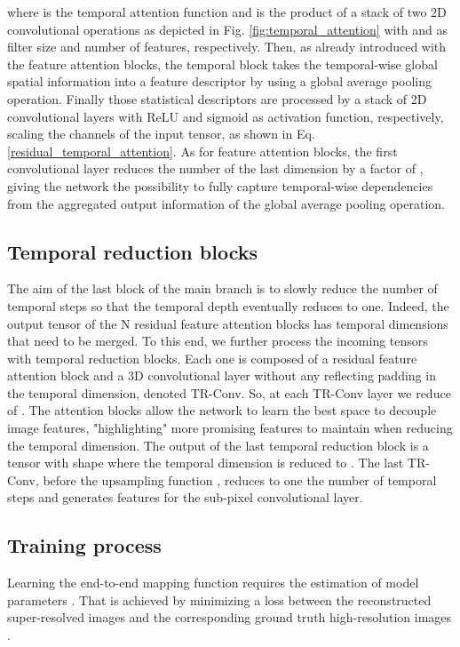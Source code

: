 \documentclass[journal]{IEEEtran}
\begin{document}
where  is the temporal attention function and  is the product of a stack of two 2D convolutional operations as depicted in Fig. \ref{fig:temporal_attention} with  and  as filter size and number of features, respectively. Then, as already introduced with the feature attention blocks, the temporal block takes the temporal-wise global spatial information into a feature descriptor by using a global average pooling operation. Finally those statistical descriptors are processed by a stack of 2D convolutional layers with ReLU and sigmoid as activation function, respectively, scaling the  channels of the input tensor, as shown in Eq. \ref{residual_temporal_attention}. As for feature attention blocks, the first convolutional layer reduces the number of the last dimension by a factor of , giving the network the possibility to fully capture temporal-wise dependencies from the aggregated output information of the global average pooling operation.
\subsection{Temporal reduction blocks}
The aim of the last block of the main branch is to slowly reduce the number of temporal steps so that the temporal depth eventually reduces to one. Indeed, the output tensor  of the N residual feature attention blocks has  temporal dimensions that need to be merged. To this end, we further process the incoming tensors with  temporal reduction blocks. Each one is composed of a residual feature attention block and a 3D convolutional layer without any reflecting padding in the temporal dimension, denoted TR-Conv. So, at each TR-Conv layer we reduce  of . The attention blocks allow the network to learn the best space to decouple image features, "highlighting" more promising features to maintain when reducing the temporal dimension. The output of the last temporal reduction block is a tensor  with shape  where the temporal dimension  is reduced to . The last TR-Conv, before the upsampling
function , reduces to one the number of temporal steps and generates  features for the sub-pixel convolutional layer.
\subsection{Training process}
\label{sec:training}
Learning the end-to-end mapping function  requires the estimation of model parameters .
That is achieved by minimizing a loss  between the reconstructed super-resolved images  and the corresponding ground truth high-resolution images .
\end{document}
